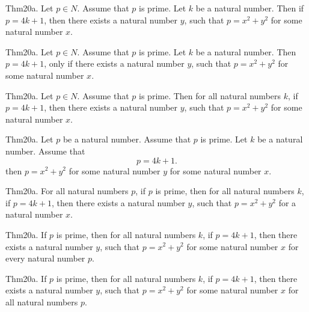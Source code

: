 \documentclass{article}
\begin{document}
Thm20a. Let $p \in N$. Assume that $p$ is prime. Let $k$ be a natural number. Then if $p = 4 k + 1$, then there exists a natural number $y$, such that $p = x ^{ 2}+ y ^{ 2}$ for some natural number $x$.

Thm20a. Let $p \in N$. Assume that $p$ is prime. Let $k$ be a natural number. Then $p = 4 k + 1$, only if there exists a natural number $y$, such that $p = x ^{ 2}+ y ^{ 2}$ for some natural number $x$.

Thm20a. Let $p \in N$. Assume that $p$ is prime. Then for all natural numbers $k$, if $p = 4 k + 1$, then there exists a natural number $y$, such that $p = x ^{ 2}+ y ^{ 2}$ for some natural number $x$.

Thm20a. Let $p$ be a natural number. Assume that $p$ is prime. Let $k$ be a natural number. Assume that $$p = 4 k + 1.$$ then $p = x ^{ 2}+ y ^{ 2}$ for some natural number $y$ for some natural number $x$.

Thm20a. For all natural numbers $p$, if $p$ is prime, then for all natural numbers $k$, if $p = 4 k + 1$, then there exists a natural number $y$, such that $p = x ^{ 2}+ y ^{ 2}$ for a natural number $x$.

Thm20a. If $p$ is prime, then for all natural numbers $k$, if $p = 4 k + 1$, then there exists a natural number $y$, such that $p = x ^{ 2}+ y ^{ 2}$ for some natural number $x$ for every natural number $p$.

Thm20a. If $p$ is prime, then for all natural numbers $k$, if $p = 4 k + 1$, then there exists a natural number $y$, such that $p = x ^{ 2}+ y ^{ 2}$ for some natural number $x$ for all natural numbers $p$.
\end{document}
